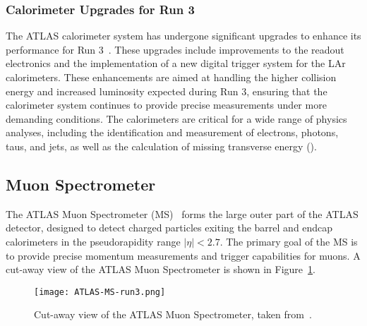         \subsubsection{Calorimeter Upgrades for Run 3}
            The ATLAS calorimeter system has undergone significant upgrades to enhance its performance for Run 3~\cite{ATLAS-TDR-22}. 
            These upgrades include improvements to the readout electronics and the implementation of a new digital 
            trigger system for the LAr calorimeters. These enhancements are aimed at handling the higher collision 
            energy and increased luminosity expected during Run 3, ensuring that the calorimeter system continues 
            to provide precise measurements under more demanding conditions.
            The calorimeters are critical for a wide range of physics analyses, including the identification and measurement 
            of electrons, photons, taus, and jets, as well as the calculation of missing transverse energy (\MET). 
    \subsection{Muon Spectrometer}
        The ATLAS Muon Spectrometer (MS)~\cite{ATLAS-TDR-10} forms the large outer part of the ATLAS detector, designed 
        to detect charged particles exiting the barrel and endcap calorimeters in the pseudorapidity range \(|\eta| < 2.7\). 
        The primary goal of the MS is to 
        provide precise momentum measurements and trigger capabilities for muons. A cut-away view of the
        ATLAS Muon Spectrometer is shown in Figure~\ref{fig:MS_cutaway}.
        \begin{figure}[htbp]
            \centering
            \texttt{[image: ATLAS-MS-run3.png]}
            \caption{Cut-away view of the ATLAS Muon Spectrometer, taken from~\cite{GENR-2019-02}.}
            \label{fig:MS_cutaway}
        \end{figure}

